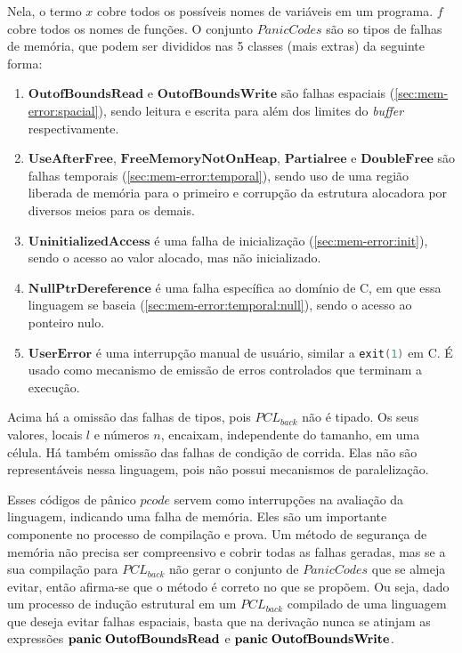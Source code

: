 Nela, o termo $x$ cobre todos os possíveis nomes de variáveis em um programa. 
$f$ cobre todos os nomes de funções. O conjunto $PanicCodes$ são so tipos de falhas de memória, que podem ser divididos nas 5 classes (mais extras) da seguinte forma:
\begin{enumerate}
	\item $\mathbf{OutofBoundsRead}$ e $\mathbf{OutofBoundsWrite}$ são falhas espaciais (\ref{sec:mem-error:spacial}), sendo leitura e escrita para além dos limites do \emph{buffer} respectivamente.
	\item $\mathbf{UseAfterFree}$, $\mathbf{FreeMemoryNotOnHeap}$, $\mathbf{Partial ree}$ e $\mathbf{Double Free}$ são falhas temporais (\ref{sec:mem-error:temporal}), sendo uso de uma região liberada de memória para o primeiro e corrupção da estrutura alocadora por diversos meios para os demais.
	\item $\mathbf{UninitializedAccess}$ é uma falha de inicialização (\ref{sec:mem-error:init}), sendo o acesso ao valor alocado, mas não inicializado. 
	\item $\mathbf{NullPtrDereference}$ é uma falha específica ao domínio de C, em que essa linguagem se baseia (\ref{sec:mem-error:temporal:null}), sendo o acesso ao ponteiro nulo.
	\item $\mathbf{UserError}$ é uma interrupção manual de usuário, similar a \lstinline[language=C]|exit(1)| em C. É usado como mecanismo de emissão de erros controlados que terminam a execução.
\end{enumerate}

\noindent Acima há a omissão das falhas de tipos, pois $PCL_{back}$ não é tipado. Os seus valores, locais $l$ e números $n$, encaixam, independente do tamanho, em uma célula. Há também omissão das falhas de condição de corrida. Elas não são representáveis nessa linguagem, pois não possui mecanismos de paralelização.

Esses códigos de pânico $pcode$ servem como interrupções na avaliação da linguagem, indicando uma falha de memória. Eles são um importante componente no processo de compilação e prova. Um método de segurança de memória não precisa ser compreensivo e cobrir todas as falhas geradas, mas se a sua compilação para $PCL_{back}$ não gerar o conjunto de $PanicCodes$ que se almeja evitar, então afirma-se que o método é correto no que se propõem. Ou seja, dado um processo de indução estrutural em um $PCL_{back}$ compilado de uma linguagem que deseja evitar falhas espaciais, basta que na derivação nunca se atinjam as expressões $\mathbf{panic}\;\mathbf{OutofBoundsRead}$ e $\mathbf{panic}\;\mathbf{OutofBoundsWrite}$.

